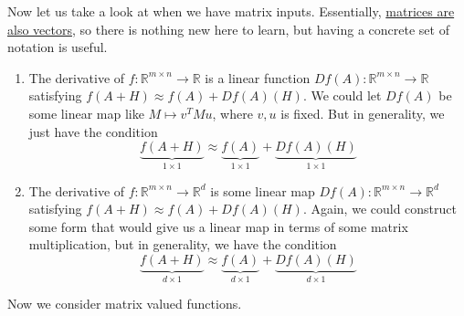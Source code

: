 	Now let us take a look at when we have matrix inputs. Essentially, \hyperref[lin-thm:vector-space-of-matrices]{matrices are also vectors}, so there is nothing new here to learn, but having a concrete set of notation is useful. 

  \begin{enumerate}
    \item The derivative of $f: \mathbb{R}^{m \times n} \to \mathbb{R}$ is a linear function $D f(A) : \mathbb{R}^{m \times n} \to \mathbb{R}$ satisfying $f(A + H) \approx f(A) + D f(A) (H)$. We could let $D f(A)$ be some linear map like $M \mapsto v^T M u$, where $v, u$ is fixed. But in generality, we just have the condition 
    \begin{equation}
      \underbrace{f(A + H)}_{1 \times 1} \approx \underbrace{f(A)}_{1 \times 1} + \underbrace{D f(A) (H)}_{1 \times 1}
    \end{equation}
    
    \item The derivative of $f: \mathbb{R}^{m \times n} \to \mathbb{R}^d$ is some linear map $D f(A) : \mathbb{R}^{m \times n} \to \mathbb{R}^d$ satisfying $f (A + H) \approx f(A) + D f(A) (H)$. Again, we could construct some form that would give us a linear map in terms of some matrix multiplication, but in generality, we have the condition 
    \begin{equation}
      \underbrace{f (A + H)}_{d \times 1} \approx \underbrace{f(A)}_{d \times 1} + \underbrace{D f(A) (H)}_{d \times 1}
    \end{equation}
  \end{enumerate}

	Now we consider matrix valued functions. 

